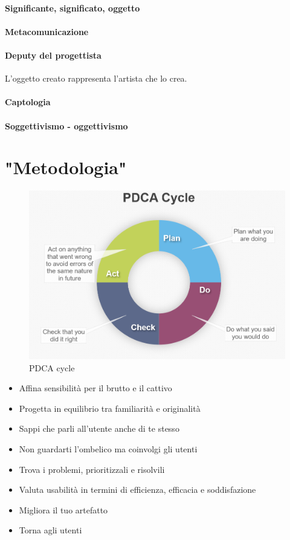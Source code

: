\documentclass[11pt,a4paper]{book}
\begin{document}
\paragraph{Significante, significato, oggetto}


\paragraph{Metacomunicazione}


\paragraph{Deputy del progettista}
L'oggetto creato rappresenta l'artista che lo crea.

\paragraph{Captologia}


\paragraph{Soggettivismo - oggettivismo}


\section{"Metodologia"}
\begin{figure}[h!]
	\begin{center}
		\includegraphics[scale=0.4]{img/011.png}
		\caption{PDCA cycle}
		\label{fig: 011}
	\end{center}
\end{figure}
\begin{itemize}
	\item Affina sensibilità per il brutto e il cattivo
	\item Progetta in equilibrio tra familiarità e originalità
	\item Sappi che parli all'utente anche di te stesso
	\item Non guardarti l'ombelico ma coinvolgi gli utenti
	\item Trova i problemi, prioritizzali e risolvili
	\item Valuta usabilità in termini di efficienza, efficacia e soddisfazione
	\item Migliora il tuo artefatto
	\item Torna agli utenti
\end{itemize}
\end{document}
